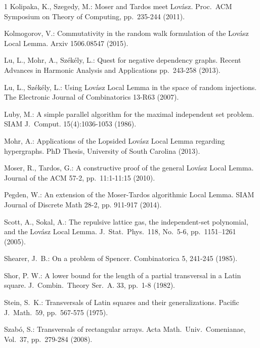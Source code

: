 \begin{thebibliography}{1}
Kolipaka, K., Szegedy, M.: {Moser and Tardos meet Lov\'asz}. Proc.\ ACM Symposium on Theory of Computing, pp.\ 235-244 (2011). 

Kolmogorov, V.: Commutativity in the random walk formulation of the Lov\'{a}sz Local Lemma. Arxiv 1506.08547 (2015).

Lu, L., Mohr, A., Sz\'{e}k\'{e}ly, L.: Quest for negative dependency graphs. Recent Advances in Harmonic Analysis and Applications pp.\ 243-258 (2013).

Lu, L., Sz\'{e}k\'{e}ly, L.: Using Lov\'{a}sz Local Lemma in the space of random injections. The Electronic Journal of Combinatorics 13-R63 (2007).

Luby, M.: A simple parallel algorithm for the maximal independent set problem. SIAM J.\ Comput. 15(4):1036-1053 (1986). 

Mohr, A.: Applications of the Lopsided Lov\'{a}sz Local Lemma regarding hypergraphs. PhD Thesis, University of South Carolina (2013).


Moser, R., Tardos, G.: A constructive proof of the general Lov\'{a}sz Local Lemma. Journal of the ACM 57-2, pp.\ 11:1-11:15 (2010).

Pegden, W.: An extension of the Moser-Tardos algorithmic Local Lemma. SIAM Journal of Discrete Math 28-2, pp. 911-917 (2014).

Scott, A., Sokal, A.: The repulsive lattice gas, the independent-set polynomial, and the Lov\'{a}sz Local Lemma. J.\ Stat.\ Phys.\ 118, No.\ 5-6, pp.\ 1151–1261 (2005).

Shearer, J.\ B.: On a problem of Spencer. Combinatorica 5, 241-245 (1985).

Shor, P. W.: A lower bound for the length of a partial transversal in a Latin square. J.\ Combin.\ Theory Ser.\ A. 33, pp.\ 1-8 (1982). 

Stein, S.\ K.: Transversals of Latin squares and their generalizations. Pacific J.\ Math.\ 59, pp.\ 567-575 (1975). 

Szab\'{o}, S.: Transversals of rectangular arrays. 
Acta Math.\ Univ.\ Comenianae, Vol.\ 37, pp.\ 279-284 (2008).

\end{thebibliography}


%

